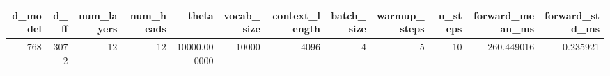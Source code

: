\begin{tabular}{rrrrrrrrrrrr}
\toprule
d_model & d_ff & num_layers & num_heads & theta & vocab_size & context_length & batch_size & warmup_steps & n_steps & forward_mean_ms & forward_std_ms \\
\midrule
768 & 3072 & 12 & 12 & 10000.000000 & 10000 & 4096 & 4 & 5 & 10 & 260.449016 & 0.235921 \\
\bottomrule
\end{tabular}
